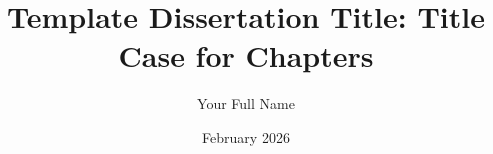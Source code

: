 

\usepackage{tabularray}      %
\usepackage{booktabs}        %
\usepackage{longtable}       %

\usepackage{mathtools}       %
\usepackage{pifont}          %
\usepackage{siunitx}         %
\usepackage{relsize}         %
\usepackage[version=4]{mhchem} %

\usepackage{float}           %
\usepackage{stfloats}       %
\usepackage{subcaption}     %
\usepackage{rotating}       %

\usepackage{algorithm}       %
\usepackage[noend]{algpseudocode}

\usepackage{lipsum}          %
\usepackage{enumitem}       %
\usepackage{verbatim}       %
\usepackage{afterpage}      %

\title{Template Dissertation Title: Title Case for Chapters}
\author{Your Full Name}
\date{February 2026}

